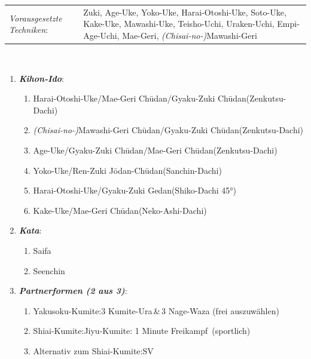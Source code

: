 	\renewcommand{\labelenumi}{\alph{enumi}.)}
\renewcommand{\labelenumii}{\arabic*.}
{\scriptsize \begin{tabularx}{\textwidth}{lX}
	\textit{Vorausgesetzte Techniken}:& Zuki, Age-Uke, Yoko-Uke, Harai-Otoshi-Uke, Soto-Uke, Kake-Uke, Mawashi-Uke, Teisho-Uchi, Uraken-Uchi, \mbox{Empi-Age-Uchi}, Mae-Geri, \textit{(Chisai-no-)}Mawashi-Geri
\end{tabularx}\\}
\begin{enumerate}[nosep]
	\item \textit{\textbf{Kihon-Ido}}:
	\begin{enumerate}[nosep]
		\item Harai-Otoshi-Uke/Mae-Geri Ch\={u}dan/Gyaku-Zuki Ch\={u}dan\tabto{280pt}(Zenkutsu-Dachi)
		\item \textit{(Chisai-no-)}Mawashi-Geri Ch\={u}dan/Gyaku-Zuki Ch\={u}dan\tabto{280pt}(Zenkutsu-Dachi)
		\item Age-Uke/Gyaku-Zuki Ch\={u}dan/Mae-Geri Ch\={u}dan\tabto{280pt}(Zenkutsu-Dachi)
		\item Yoko-Uke/Ren-Zuki J\={o}dan-Ch\={u}dan\tabto{280pt}(Sanchin-Dachi)
		\item Harai-Otoshi-Uke/Gyaku-Zuki Gedan\tabto{280pt}(Shiko-Dachi 45°)
		\item Kake-Uke/Mae-Geri Ch\={u}dan\tabto{280pt}(Neko-Ashi-Dachi)
	\end{enumerate}
	\item \textit{\textbf{Kata}}:
	\begin{enumerate}[nosep]
		\item Saifa
		\item Seenchin
	\end{enumerate}
	\item \textit{\textbf{Partnerformen (2 aus 3)}}:
	\begin{enumerate}[nosep]
		\item Yakusoku-Kumite:\tabto{200pt}3 Kumite-Ura\,\&\,3 Nage-Waza (frei auszuwählen)
		\item Shiai-Kumite:\tabto{200pt}Jiyu-Kumite: 1 Minute \frqq Freikampf\flqq~(sportlich)
		\item Alternativ zum Shiai-Kumite:\tabto{200pt}SV
	\end{enumerate}
\end{enumerate}